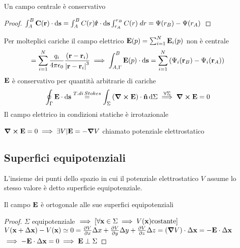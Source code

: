 \documentclass[12pt,a4paper]{article}
\begin{document}
\begin{proposition}
    Un campo centrale è conservativo 
\end{proposition}
\begin{proof}
    $\int_{A}^{B}\vb{C}(\vb{r})\cdot \dd{\vb{s}}=\int_{A}^{B}C(r)\vu{r}\cdot \dd{\vb{s}}\int_{r_A}^{r_B}C(r)\;dr= \Psi(r_B)-\Psi(r_A)$
\end{proof}
Per molteplici cariche il campo elettrico $\vb{E}(p)= \sum_{i=1}^{N} \vb{E}_i(p) $ non è centrale
\begin{equation*}
    = \sum_{i=1}^{N}\frac{q_i}{4\pi\epsilon_0}\frac{(\vb{r}-\vb{r}_i)}{\abs{\vb{r}-\vb{r}_i}^3}\implies\int_{A,\Gamma}^{B}\vb{E}(p)\cdot \dd{\vb{s}}
    =\sum_{i=1}^{N}\left( \Psi_i(\vb{r}_B)-\Psi_i(\vb{r}_A) \right) 
\end{equation*}
$\vb{E}$ è conservativo per quantità arbitrarie di cariche
\begin{equation*}
    \oint_\Gamma \vb{E}\cdot \dd{\vb{s}} \overset{T.di\,Stokes}{=}\int_{\Sigma} \left( \curl \vb{E} \right)\cdot \vu{n}\dd{\Sigma}
    \overset{\forall\Sigma}{\implies}\curl\vb{E}=0
\end{equation*}
Il campo elettrico in condizioni statiche è irrotazionale
\begin{definition}
    $\curl\vb{E}=0\implies \exists V | \vb{E}=- \grad V$ chiamato potenziale elettrostatico
\end{definition}

\subsection{Superfici equipotenziali}
\begin{definition}
    L'insieme dei punti dello spazio in cui il potenziale elettrostatico $V$ assume lo stesso valore
    è detto superficie equipotenziale.   
\end{definition}

\begin{proposition}
    Il campo $\vb{E}$ è ortogonale alle sue superfici equipotenziali
\end{proposition}
\begin{proof}
    $\Sigma$ equipotenziale $\implies\left[ \forall \vb{x} \in\Sigma \implies V(\vb{x}) \text{costante} \right]$
    \\$V(\vb{x}+\Delta\vb{x})-V(\vb{x})\simeq0=\pdv{V}{x}\Delta x+\pdv{V}{y}\Delta y+\pdv{V}{z}\Delta z= (\grad V)\cdot\Delta\vb{x}= - \vb{E}\cdot\Delta\vb{x}$
    \\$\implies-\vb{E}\cdot\Delta\vb{x}=0\implies\vb{E}\perp\Sigma$
\end{proof}
\end{document}
